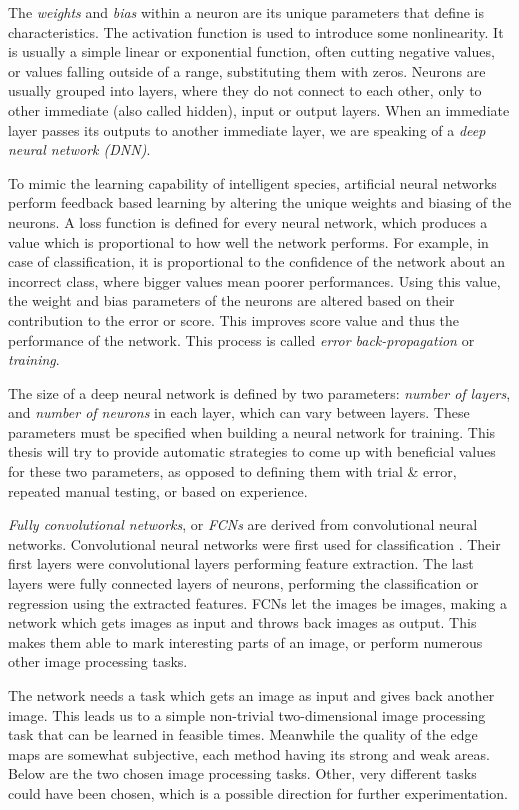 \documentclass[12pt]{report}
\begin{document}
The \textit{weights} and \textit{bias} within a neuron are its unique parameters that define is characteristics. The activation function is used to introduce some nonlinearity. It is usually a simple linear or exponential function, often cutting negative values, or values falling outside of a range, substituting them with zeros. Neurons are usually grouped into layers, where they do not connect to each other, only to other immediate (also called hidden), input or output layers. When an immediate layer passes its outputs to another immediate layer, we are speaking of a \textit{deep neural network (DNN)}.

To mimic the learning capability of intelligent species, artificial neural networks perform feedback based learning by altering the unique weights and biasing of the neurons. A loss function is defined for every neural network, which produces a value which is proportional to how well the network performs. For example, in case of classification, it is proportional to the confidence of the network about an incorrect class, where bigger values mean poorer performances. Using this value, the weight and bias parameters of the neurons are altered based on their contribution to the error or score. This improves score value and thus the performance of the network. This process is called \textit{error back-propagation} or \textit{training}.

The size of a deep neural network is defined by two parameters: \textit{number of layers}, and \textit{number of neurons} in each layer, which can vary between layers. These parameters must be specified when building a neural network for training. This thesis will try to provide automatic strategies to come up with beneficial values for these two parameters, as opposed to defining them with trial \& error, repeated manual testing, or based on experience.

\textit{Fully convolutional networks}, or \textit{FCNs} are derived from convolutional neural networks. Convolutional neural networks were first used for classification \cite{applications}. Their first layers were convolutional layers performing feature extraction. The last layers were fully connected layers of neurons, performing the classification or regression using the extracted features. FCNs let the images be images, making a network which gets images as input and throws back images as output. This makes them able to mark interesting parts of an image, or perform numerous other image processing tasks.

The network needs a task which gets an image as input and gives back another image. This leads us to a simple non-trivial two-dimensional image processing task that can be learned in feasible times. Meanwhile the quality of the edge maps are somewhat subjective, each method having its strong and weak areas. Below are the two chosen image processing tasks. Other, very different tasks could have been chosen, which is a possible direction for further experimentation.
\end{document}
